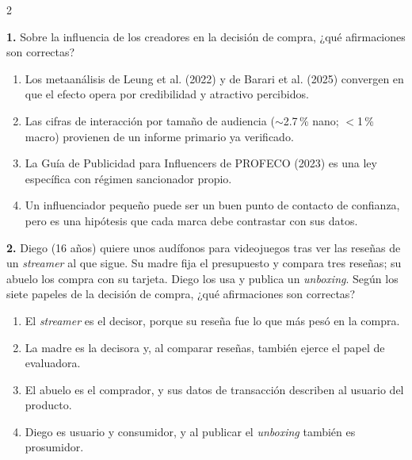 \documentclass[10pt,letterpaper]{article}
\newcommand{\cas}{\framebox[1.0em]{\rule{0pt}{1.05ex}}}
\begin{document}
\begin{multicols}{2}
\begin{minipage}[t]{\columnwidth}\noindent\textbf{1.} Sobre la influencia de los creadores en la decisión de compra, ¿qué afirmaciones son correctas?
\vspace{1pt}\begin{enumerate}[label=\cas\ \alph*),leftmargin=2.3em,itemsep=1.2pt,topsep=1pt,parsep=0pt,partopsep=0pt]
\item Los metaanálisis de Leung et al. (2022) y de Barari et al. (2025) convergen en que el efecto opera por credibilidad y atractivo percibidos.
\item Las cifras de interacción por tamaño de audiencia (${\sim}$2.7\,\% nano; $<$1\,\% macro) provienen de un informe primario ya verificado.
\item La Guía de Publicidad para Influencers de PROFECO (2023) es una ley específica con régimen sancionador propio.
\item Un influenciador pequeño puede ser un buen punto de contacto de confianza, pero es una hipótesis que cada marca debe contrastar con sus datos.
\end{enumerate}\end{minipage}\par\vspace{3pt}
\begin{minipage}[t]{\columnwidth}\noindent\textbf{2.} Diego (16 años) quiere unos audífonos para videojuegos tras ver las reseñas de un \textit{streamer} al que sigue. Su madre fija el presupuesto y compara tres reseñas; su abuelo los compra con su tarjeta. Diego los usa y publica un \textit{unboxing}. Según los siete papeles de la decisión de compra, ¿qué afirmaciones son correctas?
\vspace{1pt}\begin{enumerate}[label=\cas\ \alph*),leftmargin=2.3em,itemsep=1.2pt,topsep=1pt,parsep=0pt,partopsep=0pt]
\item El \textit{streamer} es el decisor, porque su reseña fue lo que más pesó en la compra.
\item La madre es la decisora y, al comparar reseñas, también ejerce el papel de evaluadora.
\item El abuelo es el comprador, y sus datos de transacción describen al usuario del producto.
\item Diego es usuario y consumidor, y al publicar el \textit{unboxing} también es prosumidor.
\end{enumerate}\end{minipage}\par\vspace{3pt}

\end{multicols}
\end{document}

